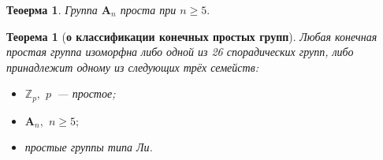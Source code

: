 \documentclass[a4paper, 14pt]{extarticle}
\newcommand{\integers}{\mathbb{Z}}
\newcommand{\alternating}{\mathbf{A}}
\theoremstyle{definition}
\theoremstyle{plain}
\newtheorem{theorem}{Теоерма}
\newtheorem*{theorem*}{Теорема}
\numberwithin{theorem}{section}
\numberwithin{definition}{section}
\numberwithin{statement}{section}
\numberwithin{lemma}{section}
\numberwithin{consequence}{section}
\begin{document}
         \begin{theorem}
             Группа $\alternating_n$ проста при ${n \geqslant 5.}$
         \end{theorem}
         \begin{theorem*}[\textbf{о классификации конечных простых групп}]
             Любая конечная простая группа изоморфна либо одной из 26 спорадических групп, либо принадлежит одному из следующих трёх семейств:
             \begin{itemize}
             \setlength\itemsep{0.1em}
                 \item ${\integers_p,}$ $p$~--- простое;
                 \item ${\alternating_n,}$ ${n \geqslant 5;}$
                 \item простые группы типа Ли.
             \end{itemize}
         \end{theorem*}
        \newpage
\end{document}
